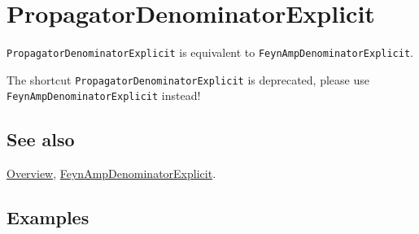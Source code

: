 \documentclass[../FeynCalcManual.tex]{subfiles}
\begin{document}
\hypertarget{propagatordenominatorexplicit}{
\section{PropagatorDenominatorExplicit}\label{propagatordenominatorexplicit}}

\texttt{PropagatorDenominatorExplicit} is equivalent to
\texttt{FeynAmpDenominatorExplicit}.

The shortcut \texttt{PropagatorDenominatorExplicit} is deprecated,
please use \texttt{FeynAmpDenominatorExplicit} instead!

\subsection{See also}

\hyperlink{toc}{Overview},
\hyperlink{feynampdenominatorexplicit}{FeynAmpDenominatorExplicit}.

\subsection{Examples}
\end{document}
